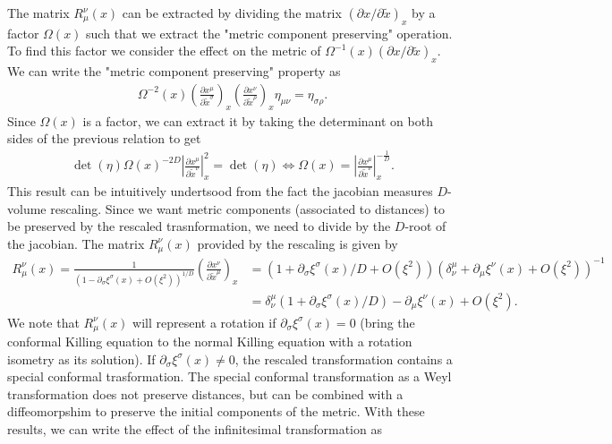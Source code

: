 \documentclass[10pt, a4paper]{article}
\begin{document}
{\begin{enumerate}
  The matrix $R_{\mu}^{\nu} (x)$ can be extracted by dividing the matrix $(\partial x/\partial \tilde{x})_{x}$ by a factor $\Omega(x)$ such that we extract the "metric component preserving" operation. To find this factor we consider the effect on the metric of $\Omega^{-1}(x)(\partial x/\partial \tilde{x})_{x}$. We can write the "metric component preserving" property as
  \begin{align*}
    \Omega^{-2}(x) \left(\frac{\partial x^{\mu}}{\partial \tilde{x}^\sigma}\right)_{x} \left(\frac{\partial x^\nu}{\partial \tilde{x}^{\rho}}\right)_{x} \eta_{\mu\nu} = \eta_{\sigma \rho}.
  \end{align*}
  Since $\Omega(x)$ is a factor, we can extract it by taking the determinant on both sides of the previous relation to get 
  \begin{align*}
    \det(\eta) \Omega(x)^{-2D} \left|\frac{\partial x^\mu }{\partial \tilde{x}^\nu}\right|_{x}^2 = \det(\eta) \iff \Omega(x) = \left|\frac{\partial x^\mu }{\partial \tilde{x}^\nu}\right|_{x}^{-\frac{1}{D}}.
  \end{align*}
  This result can be intuitively undertsood from the fact the jacobian measures $D$-volume rescaling. Since we want metric components (associated to distances) to be preserved by the rescaled trasnformation, we need to divide by the $D$-root of the jacobian. The matrix $R_{\mu}^{\nu} (x)$ provided by the rescaling is given by 
  \begin{align*}
    R_{\mu}^{\nu} (x) = \frac{1}{(1- \partial_\sigma \xi^\sigma(x) + O(\xi^2))^{1/D}} \left(\frac{\partial x^\nu }{\partial \tilde{x}^\mu}\right)_{x} &= (1 + \partial_\sigma \xi^\sigma(x)/D + O(\xi^2))(\delta_\nu^\mu + \partial_\mu \xi^\nu(x) + O(\xi^2))^{-1}\\
    &= \delta_\nu^\mu(1 + \partial_\sigma \xi^\sigma(x)/D)  - \partial_\mu \xi^\nu(x) +  O(\xi^2). 
  \end{align*} 
  We note that $R_{\mu}^{\nu} (x)$ will represent a rotation if $\partial_\sigma \xi^\sigma(x) = 0$ (bring the conformal Killing equation to the normal Killing equation with a rotation isometry as its solution). If $\partial_\sigma \xi^\sigma(x) \neq 0$, the rescaled transformation contains a special conformal trasformation. The special conformal transformation as a Weyl transformation does not preserve distances, but can be combined with a diffeomorpshim to preserve the initial components of the metric. With these results, we can write the effect of the infinitesimal transformation as 
  \begin{align*}

\end{align*}
\end{enumerate}}
\end{document}
